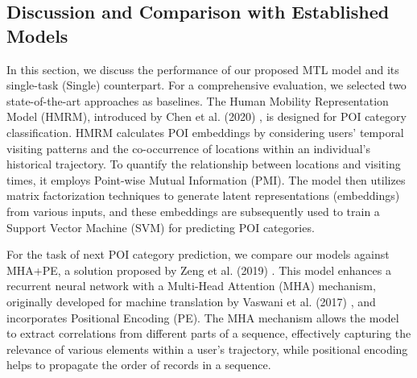 %

\subsection{Discussion and Comparison with Established Models}
In this section, we discuss the performance of our proposed MTL model and its single-task (Single) counterpart. For a comprehensive evaluation, we selected two state-of-the-art approaches as baselines. The Human Mobility Representation Model (HMRM), introduced by Chen et al. (2020) \cite{chen2020modeling}, is designed for POI category classification. HMRM calculates POI embeddings by considering users' temporal visiting patterns and the co-occurrence of locations within an individual's historical trajectory. To quantify the relationship between locations and visiting times, it employs Point-wise Mutual Information (PMI). The model then utilizes matrix factorization techniques to generate latent representations (embeddings) from various inputs, and these embeddings are subsequently used to train a Support Vector Machine (SVM) for predicting POI categories.

For the task of next POI category prediction, we compare our models against MHA+PE, a solution proposed by Zeng et al. (2019) \cite{zeng2019next}. This model enhances a recurrent neural network with a Multi-Head Attention (MHA) mechanism, originally developed for machine translation by Vaswani et al. (2017) \cite{vaswani2017attention}, and incorporates Positional Encoding (PE). The MHA mechanism allows the model to extract correlations from different parts of a sequence, effectively capturing the relevance of various elements within a user's trajectory, while positional encoding helps to propagate the order of records in a sequence.

